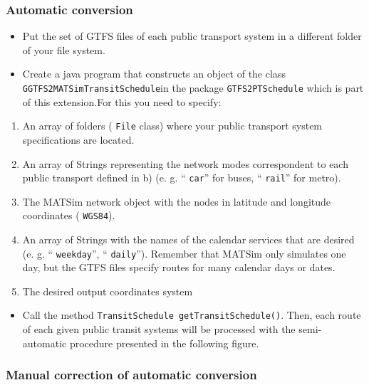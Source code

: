 \documentclass[a4paper,11pt]{report}
\begin{document}
\subsubsection{Automatic conversion}
\begin{itemize}
	\item Put the set of GTFS files of each public transport system in a different folder of your file system.
	\item Create a java program that constructs an object of the class
\texttt{GGTFS2MATSimTransitSchedule}in the package 
\texttt{GTFS2PTSchedule} which is part of this extension.For this you need to specify:
\end{itemize}
\begin{enumerate}
	\item An array of folders (
\texttt{File} class) where your public transport system specifications are located.
	\item An array of Strings representing the network modes correspondent to each public transport defined in b) (e. g. “
\texttt{car}” for buses, “
\texttt{rail}” for metro).
	\item The MATSim network object with the nodes in latitude and longitude coordinates (
\texttt{WGS84}).
	\item An array of Strings with the names of the calendar services that are desired (e. g. “
\texttt{weekday}”, “
\texttt{daily}”). Remember that MATSim only simulates one day, but the GTFS files specify routes for many calendar days or dates.
	\item The desired output coordinates system
\end{enumerate}
\begin{itemize}
	\item Call the method 
\texttt{TransitSchedule getTransitSchedule()}.  Then, each route of each given public transit systems will be processed  with the semi-automatic procedure presented in the following figure.
\\
\end{itemize}



\subsubsection{Manual correction of automatic conversion}
\end{document}
